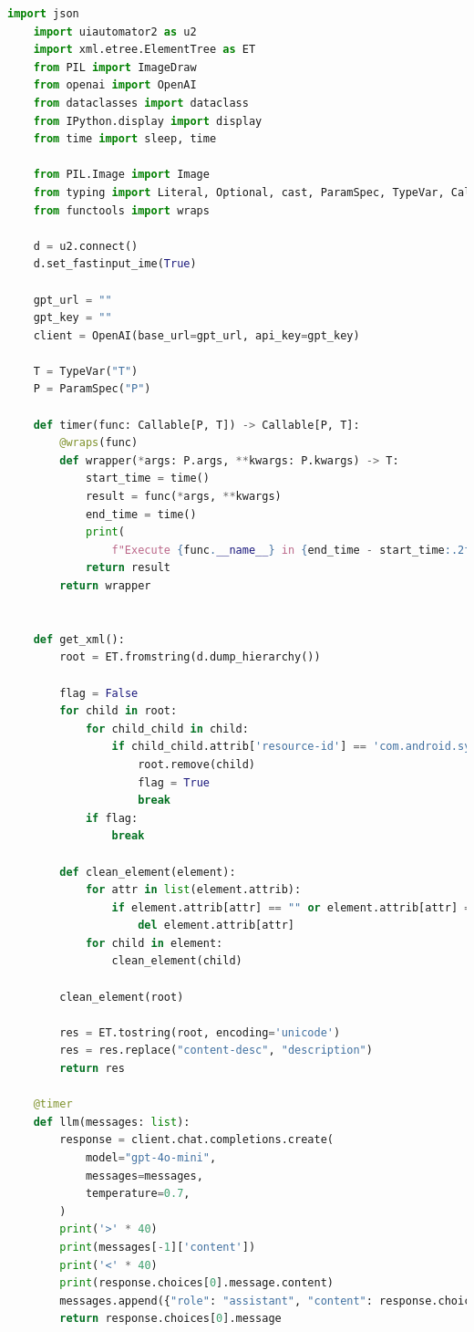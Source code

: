 \documentclass[UTF8, fontset=windows]{article}
\begin{document}
\begin{lstlisting}[language=Python]
    import json
    import uiautomator2 as u2
    import xml.etree.ElementTree as ET
    from PIL import ImageDraw
    from openai import OpenAI
    from dataclasses import dataclass
    from IPython.display import display
    from time import sleep, time
    
    from PIL.Image import Image
    from typing import Literal, Optional, cast, ParamSpec, TypeVar, Callable
    from functools import wraps
    
    d = u2.connect()
    d.set_fastinput_ime(True)
    
    gpt_url = ""
    gpt_key = ""
    client = OpenAI(base_url=gpt_url, api_key=gpt_key)
    
    T = TypeVar("T")
    P = ParamSpec("P")
    
    def timer(func: Callable[P, T]) -> Callable[P, T]:
        @wraps(func)
        def wrapper(*args: P.args, **kwargs: P.kwargs) -> T:
            start_time = time()
            result = func(*args, **kwargs)
            end_time = time()
            print(
                f"Execute {func.__name__} in {end_time - start_time:.2f} seconds")
            return result
        return wrapper
    

    def get_xml():
        root = ET.fromstring(d.dump_hierarchy())
    
        flag = False
        for child in root:
            for child_child in child:
                if child_child.attrib['resource-id'] == 'com.android.systemui:id/status_bar_container':
                    root.remove(child)
                    flag = True
                    break
            if flag:
                break
            
        def clean_element(element):
            for attr in list(element.attrib):
                if element.attrib[attr] == "" or element.attrib[attr] == "false":
                    del element.attrib[attr]
            for child in element:
                clean_element(child)
                
        clean_element(root)
    
        res = ET.tostring(root, encoding='unicode')
        res = res.replace("content-desc", "description")
        return res
    
    @timer
    def llm(messages: list):
        response = client.chat.completions.create(
            model="gpt-4o-mini",
            messages=messages,
            temperature=0.7,
        )
        print('>' * 40)
        print(messages[-1]['content'])
        print('<' * 40)
        print(response.choices[0].message.content)
        messages.append({"role": "assistant", "content": response.choices[0].message.content})
        return response.choices[0].message
    


\end{lstlisting}
\end{document}
